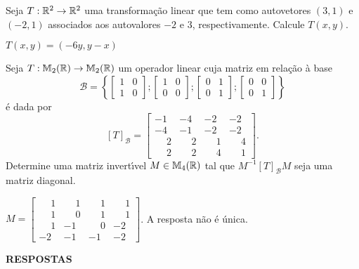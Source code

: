 \documentclass[12pt]{exam}
\begin{document}
\begin{exercicio}
  Seja $T : \mathbb{R}^2 \to \mathbb{R}^2$ uma transforma\c{c}\~ao linear que tem como autovetores $(3,1)$ e $(-2,1)$ associados aos autovalores $-2$ e $3$, respectivamente. Calcule $T(x,y)$.
  \begin{solucao}
    $T(x,y) = (-6y, y -x)$
  \end{solucao}
\end{exercicio}

\begin{exercicio}
  Seja $T : \mathbb{M}_2(\mathbb{R}) \to \mathbb{M}_2(\mathbb{R})$ um operador linear cuja matriz em rela\c{c}\~ao \`a base
  \[
    \mathcal{B} = \left\{\begin{bmatrix}1 & 0\\ 1 & 0\end{bmatrix}; \begin{bmatrix}1 & 0\\ 0 & 0\end{bmatrix}; \begin{bmatrix}0 & 1\\ 0 & 1\end{bmatrix}; \begin{bmatrix}0 & 0\\ 0 & 1\end{bmatrix}\right\}
  \]
  \'e dada por
  \[
    [T]_\mathcal{B} = \begin{bmatrix}
      -1 & -4 & -2 & -2\\
      -4 & -1 & -2 & -2\\
      \phantom{-} 2 & \phantom{-} 2 & \phantom{-} 1 & \phantom{-} 4\\
      \phantom{-} 2 & \phantom{-} 2 & \phantom{-} 4 & \phantom{-} 1
    \end{bmatrix}.
  \]
  Determine uma matriz invert{\'\i}vel $M \in \mathbb{M}_4(\mathbb{R})$ tal que $M^{-1}[T]_\mathcal{B}M$ seja uma matriz diagonal.
\begin{solucao}
  $M = \begin{bmatrix}
    \phantom{-} 1 & \phantom{-} 1 & \phantom{-} 1 & \phantom{-} 1\\
    \phantom{-} 1 & \phantom{-} 0 & \phantom{-} 1 & \phantom{-} 1\\
    \phantom{-} 1 & -1 & \phantom{-} 0 & -2\\
    -2 & -1 & -1 & -2
  \end{bmatrix}$. A resposta n\~ao \'e \'unica.
\end{solucao}
\end{exercicio}

\newpage
{}

\begin{center}
    {\large\bf RESPOSTAS}
\end{center}


\end{document}
